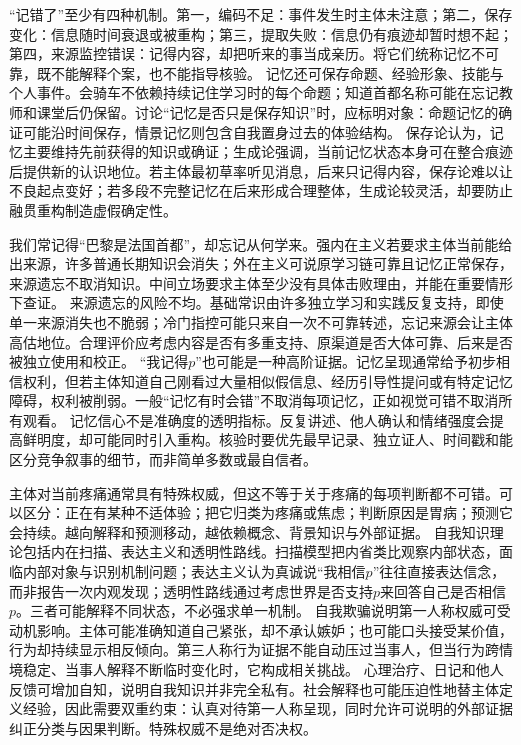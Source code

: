  “记错了”至少有四种机制。第一，编码不足：事件发生时主体未注意；第二，保存变化：信息随时间衰退或被重构；第三，提取失败：信息仍有痕迹却暂时想不起；第四，来源监控错误：记得内容，却把听来的事当成亲历。将它们统称记忆不可靠，既不能解释个案，也不能指导核验。 记忆还可保存命题、经验形象、技能与个人事件。会骑车不依赖持续记住学习时的每个命题；知道首都名称可能在忘记教师和课堂后仍保留。讨论“记忆是否只是保存知识”时，应标明对象：命题记忆的确证可能沿时间保存，情景记忆则包含自我置身过去的体验结构。 保存论认为，记忆主要维持先前获得的知识或确证；生成论强调，当前记忆状态本身可在整合痕迹后提供新的认识地位。若主体最初草率听见消息，后来只记得内容，保存论难以让不良起点变好；若多段不完整记忆在后来形成合理整体，生成论较灵活，却要防止融贯重构制造虚假确定性。

我们常记得“巴黎是法国首都”，却忘记从何学来。强内在主义若要求主体当前能给出来源，许多普通长期知识会消失；外在主义可说原学习链可靠且记忆正常保存，来源遗忘不取消知识。中间立场要求主体至少没有具体击败理由，并能在重要情形下查证。 来源遗忘的风险不均。基础常识由许多独立学习和实践反复支持，即使单一来源消失也不脆弱；冷门指控可能只来自一次不可靠转述，忘记来源会让主体高估地位。合理评价应考虑内容是否有多重支持、原渠道是否大体可靠、后来是否被独立使用和校正。 “我记得$p$”也可能是一种高阶证据。记忆呈现通常给予初步相信权利，但若主体知道自己刚看过大量相似假信息、经历引导性提问或有特定记忆障碍，权利被削弱。一般“记忆有时会错”不取消每项记忆，正如视觉可错不取消所有观看。 记忆信心不是准确度的透明指标。反复讲述、他人确认和情绪强度会提高鲜明度，却可能同时引入重构。核验时要优先最早记录、独立证人、时间戳和能区分竞争叙事的细节，而非简单多数或最自信者。

主体对当前疼痛通常具有特殊权威，但这不等于关于疼痛的每项判断都不可错。可以区分：正在有某种不适体验；把它归类为疼痛或焦虑；判断原因是胃病；预测它会持续。越向解释和预测移动，越依赖概念、背景知识与外部证据。 自我知识理论包括内在扫描、表达主义和透明性路线。扫描模型把内省类比观察内部状态，面临内部对象与识别机制问题；表达主义认为真诚说“我相信$p$”往往直接表达信念，而非报告一次内观发现；透明性路线通过考虑世界是否支持$p$来回答自己是否相信$p$。三者可能解释不同状态，不必强求单一机制。 自我欺骗说明第一人称权威可受动机影响。主体可能准确知道自己紧张，却不承认嫉妒；也可能口头接受某价值，行为却持续显示相反倾向。第三人称行为证据不能自动压过当事人，但当行为跨情境稳定、当事人解释不断临时变化时，它构成相关挑战。 心理治疗、日记和他人反馈可增加自知，说明自我知识并非完全私有。社会解释也可能压迫性地替主体定义经验，因此需要双重约束：认真对待第一人称呈现，同时允许可说明的外部证据纠正分类与因果判断。特殊权威不是绝对否决权。


